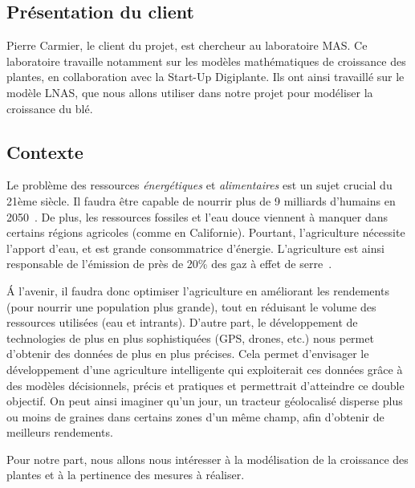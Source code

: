 \subsection{Présentation du client}
Pierre Carmier, le client du projet, est chercheur au laboratoire MAS. Ce laboratoire travaille notamment sur les modèles mathématiques de croissance des plantes, en collaboration avec la Start-Up Digiplante. Ils ont ainsi travaillé sur le modèle LNAS, que nous allons utiliser dans notre projet pour modéliser la croissance du blé.
\subsection{Contexte}
Le problème des ressources \textit{énergétiques} et \textit{alimentaires} est un sujet crucial du  21ème siècle.
Il faudra être capable de nourrir plus de 
9 milliards d'humains en 2050~\cite{wiki:popu_mondiale}.
De plus, les ressources fossiles et l'eau douce viennent à manquer dans certains régions agricoles (comme en Californie). Pourtant, l'agriculture nécessite l'apport d'eau, et est grande consommatrice d'énergie. L'agriculture est ainsi responsable de l'émission de près de 20\% des gaz à effet de serre~\cite{GES}.

\'A l'avenir, il faudra donc optimiser l'agriculture en améliorant les rendements (pour nourrir une population plus grande), tout en réduisant le volume des ressources utilisées (eau et intrants).
D'autre part, le développement de technologies de plus en plus sophistiquées (GPS, drones, etc.) nous permet d'obtenir des données de plus en plus précises.
Cela permet d'envisager le développement d'une agriculture intelligente qui exploiterait ces données grâce à des modèles décisionnels, précis et pratiques et permettrait d'atteindre ce double objectif. On peut ainsi imaginer qu'un jour, un tracteur géolocalisé disperse plus ou moins de graines dans certains zones d'un même champ, afin d'obtenir de meilleurs rendements.

Pour notre part, nous allons nous intéresser à la modélisation de la croissance des plantes et à la pertinence des mesures à réaliser.
